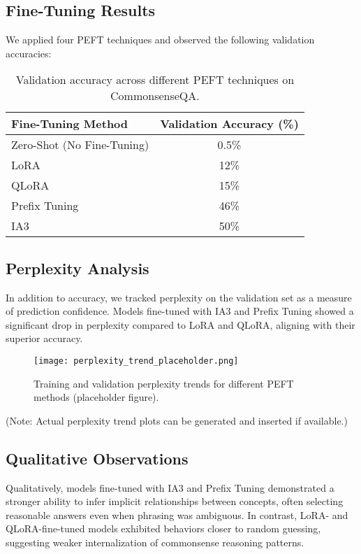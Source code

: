 \documentclass[11pt,twocolumn]{article}
\begin{document}
\subsection{Fine-Tuning Results}
We applied four PEFT techniques and observed the following validation accuracies:

\begin{table}[h]
\centering
\renewcommand{\arraystretch}{1.2}
\begin{tabular}{|l|c|}
\hline
\textbf{Fine-Tuning Method} & \textbf{Validation Accuracy (\%)} \\
\hline
Zero-Shot (No Fine-Tuning) & 0.5\% \\
LoRA & 12\% \\
QLoRA & 15\% \\
Prefix Tuning & 46\% \\
IA3 & 50\% \\
\hline
\end{tabular}
\caption{Validation accuracy across different PEFT techniques on CommonsenseQA.}
\label{table:validation-accuracy}
\end{table}

\subsection{Perplexity Analysis}
In addition to accuracy, we tracked perplexity on the validation set as a measure of prediction confidence. Models fine-tuned with IA3 and Prefix Tuning showed a significant drop in perplexity compared to LoRA and QLoRA, aligning with their superior accuracy.

\begin{figure}[h]
\centering
\texttt{[image: perplexity\_trend\_placeholder.png]}
\caption{Training and validation perplexity trends for different PEFT methods (placeholder figure).}
\label{fig:perplexity-trends}
\end{figure}

(Note: Actual perplexity trend plots can be generated and inserted if available.)

\subsection{Qualitative Observations}
Qualitatively, models fine-tuned with IA3 and Prefix Tuning demonstrated a stronger ability to infer implicit relationships between concepts, often selecting reasonable answers even when phrasing was ambiguous. In contrast, LoRA- and QLoRA-fine-tuned models exhibited behaviors closer to random guessing, suggesting weaker internalization of commonsense reasoning patterns.
\end{document}
